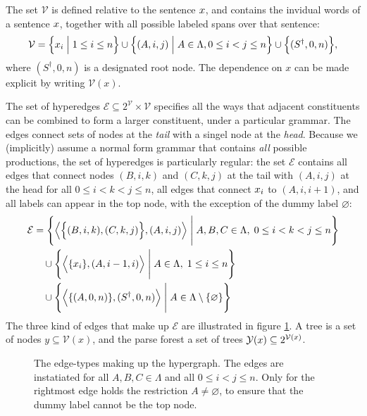     The set $\mathcal{V}$ is defined relative to the sentence $\x$, and contains the invidual words of a sentence $\x$, together with all possible labeled spans over that sentence:
    \begin{align*}
      \mathcal{V} = \Big\{ \x_i \; \Big\vert \; 1 \leq i \leq n \Big\} \cup \Big\{ (A, i, j) \; \Big\vert \; A \in \Lambda, 0 \leq i < j \leq n \Big\} \cup \Big\{ (S^{\dagger}, 0, n) \Big\},
    \end{align*}
    where $(S^{\dagger}, 0, n)$ is a designated root node. The dependence on $x$ can be made explicit by writing $\mathcal{V}(x)$.

    The set of hyperedges $\mathcal{E} \subseteq 2^{\mathcal{V}} \times \mathcal{V}$ specifies all the ways that adjacent constituents can be combined to form a larger constituent, under a particular grammar. The edges connect sets of nodes at the \textit{tail} with a singel node at the \textit{head}. Because we (implicitly) assume a normal form grammar that contains \textit{all} possible productions, the set of hyperedges is particularly regular: the set $\mathcal{E}$ contains all edges that connect nodes $(B, i, k)$ and $(C, k, j)$ at the tail with $(A, i, j)$ at the head for all $0 \leq i < k < j \leq n$, all edges that connect $\x_i$ to $(A, i, i+1)$, and all labels can appear in the top node, with the exception of the dummy label $\varnothing$:
    \begin{align*}
      \mathcal{E}
        &= \Bigg\{ \Big\langle \Big\{ (B, i, k), (C, k, j) \Big\},  (A, i, j) \Big\rangle \; \Bigg\vert \; A, B, C \in \Lambda, \; 0 \leq i < k < j \leq n \Bigg\}  \\
        &\quad\cup \Bigg\{ \Big\langle \{ \x_i \}, (A, i-1, i) \Big\rangle \; \Bigg\vert \; A \in \Lambda, \; 1 \leq i \leq n \Bigg\}  \\
        &\quad\cup \Bigg\{ \Big\langle \{ (A, 0, n) \}, (S^{\dagger}, 0, n) \Big\rangle \; \Bigg\vert \; A \in \Lambda \setminus \{ \varnothing \} \Bigg\}
    \end{align*}
    The three kind of edges that make up $\mathcal{E}$ are illustrated in figure \ref{fig:crf-edges}. A tree is a set of nodes $y \subseteq \mathcal{V}(x)$, and the parse forest a set of trees $\yieldx \subseteq 2^{\mathcal{V}(x)}$.

    \begin{figure}[h]
      \center
      \begin{tikzpicture}[scale=.6]
        
      \end{tikzpicture}
      \caption{The edge-types making up the hypergraph. The edges are instatiated for all $A, B, C \in \Lambda$ and all $0 \leq i < j \leq n$. Only for the rightmost edge holds the restriction $A \neq \varnothing$, to ensure that the dummy label cannot be the top node.}
      \label{fig:crf-edges}
    \end{figure}


